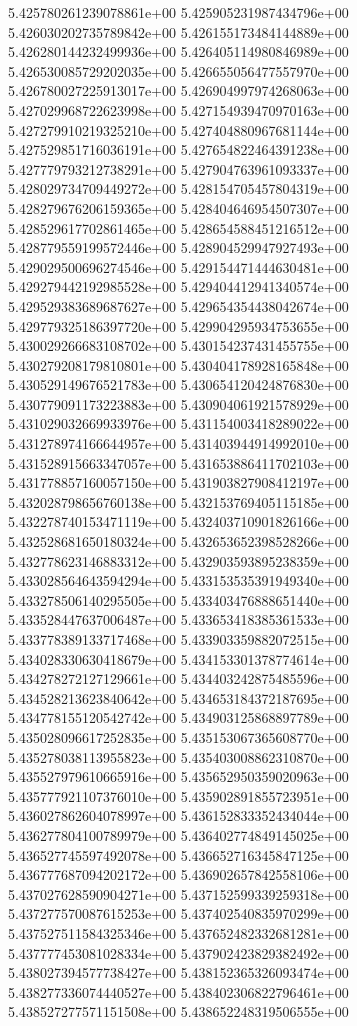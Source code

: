 5.425780261239078861e+00
5.425905231987434796e+00
5.426030202735789842e+00
5.426155173484144889e+00
5.426280144232499936e+00
5.426405114980846989e+00
5.426530085729202035e+00
5.426655056477557970e+00
5.426780027225913017e+00
5.426904997974268063e+00
5.427029968722623998e+00
5.427154939470970163e+00
5.427279910219325210e+00
5.427404880967681144e+00
5.427529851716036191e+00
5.427654822464391238e+00
5.427779793212738291e+00
5.427904763961093337e+00
5.428029734709449272e+00
5.428154705457804319e+00
5.428279676206159365e+00
5.428404646954507307e+00
5.428529617702861465e+00
5.428654588451216512e+00
5.428779559199572446e+00
5.428904529947927493e+00
5.429029500696274546e+00
5.429154471444630481e+00
5.429279442192985528e+00
5.429404412941340574e+00
5.429529383689687627e+00
5.429654354438042674e+00
5.429779325186397720e+00
5.429904295934753655e+00
5.430029266683108702e+00
5.430154237431455755e+00
5.430279208179810801e+00
5.430404178928165848e+00
5.430529149676521783e+00
5.430654120424876830e+00
5.430779091173223883e+00
5.430904061921578929e+00
5.431029032669933976e+00
5.431154003418289022e+00
5.431278974166644957e+00
5.431403944914992010e+00
5.431528915663347057e+00
5.431653886411702103e+00
5.431778857160057150e+00
5.431903827908412197e+00
5.432028798656760138e+00
5.432153769405115185e+00
5.432278740153471119e+00
5.432403710901826166e+00
5.432528681650180324e+00
5.432653652398528266e+00
5.432778623146883312e+00
5.432903593895238359e+00
5.433028564643594294e+00
5.433153535391949340e+00
5.433278506140295505e+00
5.433403476888651440e+00
5.433528447637006487e+00
5.433653418385361533e+00
5.433778389133717468e+00
5.433903359882072515e+00
5.434028330630418679e+00
5.434153301378774614e+00
5.434278272127129661e+00
5.434403242875485596e+00
5.434528213623840642e+00
5.434653184372187695e+00
5.434778155120542742e+00
5.434903125868897789e+00
5.435028096617252835e+00
5.435153067365608770e+00
5.435278038113955823e+00
5.435403008862310870e+00
5.435527979610665916e+00
5.435652950359020963e+00
5.435777921107376010e+00
5.435902891855723951e+00
5.436027862604078997e+00
5.436152833352434044e+00
5.436277804100789979e+00
5.436402774849145025e+00
5.436527745597492078e+00
5.436652716345847125e+00
5.436777687094202172e+00
5.436902657842558106e+00
5.437027628590904271e+00
5.437152599339259318e+00
5.437277570087615253e+00
5.437402540835970299e+00
5.437527511584325346e+00
5.437652482332681281e+00
5.437777453081028334e+00
5.437902423829382492e+00
5.438027394577738427e+00
5.438152365326093474e+00
5.438277336074440527e+00
5.438402306822796461e+00
5.438527277571151508e+00
5.438652248319506555e+00
